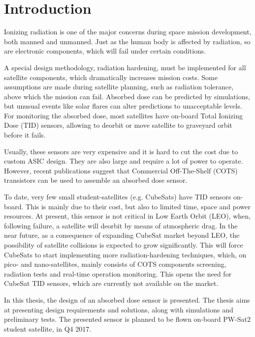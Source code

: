 \chapter{Introduction}
    Ionizing radiation is one of the major concerns during space mission development, both manned and unmanned. Just as the human body is affected by radiation, so are electronic components, which will fail under certain conditions.

    A special design methodology, radiation hardening, must be implemented for all satellite components, which dramatically increases mission costs. Some assumptions are made during satellite planning, such as radiation tolerance, above which the mission can fail. Absorbed dose can be predicted by simulations, but unusual events like solar flares can alter predictions to unacceptable levels. For monitoring the absorbed dose, most satellites have on-board Total Ionizing Dose (TID) sensors, allowing to deorbit or move satellite to graveyard orbit before it fails.

    Usually, these sensors are very expensive and it is hard to cut the cost due to custom ASIC design. They are also large and require a lot of power to operate. However, recent publications suggest that Commercial Off-The-Shelf (COTS) transistors can be used to assemble an absorbed dose sensor.

    To date, very few small student-satellites (e.g. CubeSats) have TID sensors on-board. This is mainly due to their cost, but also to limited time, space and power resources. At present, this sensor is not critical in Low Earth Orbit (LEO), when, following failure, a satellite will deorbit by means of atmospheric drag. In the near future, as a consequence of expanding CubeSat market beyond LEO, the possibility of satellite collisions is expected to grow significantly. This will force CubeSats to start implementing more radiation-hardening techniques, which, on pico- and nano-satellites, mainly consists of COTS components screening, radiation tests and real-time operation monitoring. This opens the need for CubeSat TID sensors, which are currently not available on the market.

    In this thesis, the design of an absorbed dose sensor is presented. The thesis aims at presenting design requirements and solutions, along with simulations and preliminary tests. The presented sensor is planned to be flown on-board PW-Sat2 student satellite, in Q4 2017.

